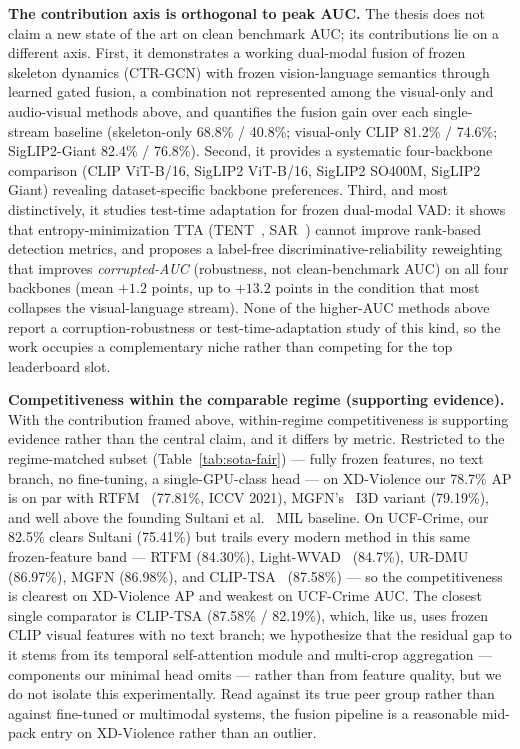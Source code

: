 \medskip\noindent\textbf{The contribution axis is orthogonal to peak AUC.}
The thesis does not claim a new state of the art on clean benchmark AUC; its
contributions lie on a different axis. First, it demonstrates a working
dual-modal fusion of frozen skeleton dynamics (CTR-GCN) with frozen
vision-language semantics through learned gated fusion, a combination not
represented among the visual-only and audio-visual methods above, and quantifies
the fusion gain over each single-stream baseline (skeleton-only 68.8\% / 40.8\%;
visual-only CLIP 81.2\% / 74.6\%; SigLIP2-Giant 82.4\% / 76.8\%). Second, it
provides a systematic four-backbone comparison (CLIP ViT-B/16, SigLIP2 ViT-B/16,
SigLIP2 SO400M, SigLIP2 Giant) revealing dataset-specific backbone preferences.
Third, and most distinctively, it studies test-time adaptation for frozen
dual-modal VAD: it shows that entropy-minimization TTA
(TENT~\cite{wang2021tent}, SAR~\cite{niu2023sar}) cannot
improve rank-based detection metrics, and proposes a label-free
discriminative-reliability reweighting that improves \emph{corrupted-AUC}
(robustness, not clean-benchmark AUC) on all four backbones (mean $+1.2$ points, up
to $+13.2$ points in the condition that most collapses the visual-language
stream). None of the higher-AUC methods above
report a corruption-robustness or test-time-adaptation study of this kind, so
the work occupies a complementary niche rather than competing for the top
leaderboard slot.

\medskip\noindent\textbf{Competitiveness within the comparable regime (supporting evidence).}
With the contribution framed above, within-regime competitiveness is supporting
evidence rather than the central claim, and it differs by metric. Restricted to
the regime-matched subset (Table~\ref{tab:sota-fair}) --- fully frozen
features, no text branch, no fine-tuning, a single-GPU-class head --- on
XD-Violence our 78.7\% AP is on par with RTFM~\cite{tian2021rtfm} (77.81\%,
ICCV 2021), MGFN's~\cite{chen2023mgfn} I3D
variant (79.19\%), and well above
the founding Sultani et al.~\cite{sultani2018ucfcrime} MIL baseline. On
UCF-Crime, our 82.5\% clears
Sultani (75.41\%) but trails every modern method in this same frozen-feature
band --- RTFM (84.30\%), Light-WVAD~\cite{wang2024lightwvad} (84.7\%),
UR-DMU~\cite{zhou2023urdmu} (86.97\%), MGFN (86.98\%),
and CLIP-TSA~\cite{joo2023cliptsa} (87.58\%) --- so the competitiveness is
clearest on XD-Violence AP
and weakest on UCF-Crime AUC. The closest single comparator is CLIP-TSA
(87.58\% / 82.19\%), which, like us, uses frozen CLIP visual features with no
text branch; we hypothesize that the residual gap to it stems from its temporal
self-attention module and multi-crop aggregation --- components our minimal head
omits --- rather than from feature quality, but we do not isolate this
experimentally. Read against its true peer group rather than against fine-tuned
or multimodal systems, the fusion pipeline is a reasonable mid-pack entry on
XD-Violence rather than an outlier.

